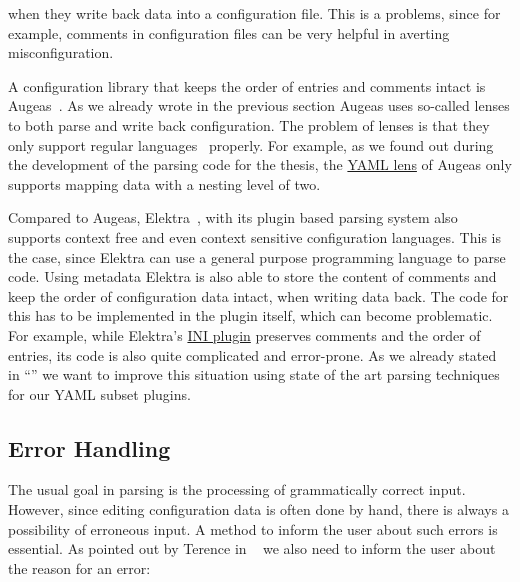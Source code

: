 when they write back data into a configuration file. This is a problems, since for example, comments in configuration files can be very helpful in averting misconfiguration.

A configuration library that keeps the order of entries and comments intact is Augeas~\cite{lutterkort2008augeas, berlakovich2016universal}. As we already wrote in the previous section Augeas uses so-called lenses to both parse and write back configuration. The problem of lenses is that they only support regular languages~\cite{chomsky1959certain} properly. For example, as we found out during the development of the parsing code for the thesis, the \href{https://github.com/hercules-team/augeas/blob/d555a995a06ac81cab62d016d6eaff8a7ba64a2e/lenses/yaml.aug}{YAML lens} of Augeas only supports mapping data with a nesting level of two.

Compared to Augeas, Elektra~\cite{raab2010modular, raab2017context}, with its plugin based parsing system also supports context free and even context sensitive configuration languages. This is the case, since Elektra can use a general purpose programming language to parse code. Using metadata Elektra is also able to store the content of comments and keep the order of configuration data intact, when writing data back. The code for this has to be implemented in the plugin itself, which can become problematic. For example, while Elektra’s \href{https://github.com/ElektraInitiative/libelektra/tree/3e6e0254a54d3ad9642091550ce9c560d8cf38dd/src/plugins/ini}{INI plugin} preserves comments and the order of entries, its code is also quite complicated and error-prone. As we already stated in “” we want to improve this situation using state of the art parsing techniques for our YAML subset plugins.

\subsection{Error Handling}
\label{sec:error_handling}

The usual goal in parsing is the processing of grammatically correct input. However, since editing configuration data is often done by hand, there is always a possibility of erroneous input. A method to inform the user about such errors is essential. As pointed out by Terence \citeauthor{parr2013definitive} in ~\cite[p. 151]{parr2013definitive} we also need to inform the user about the reason for an error:


